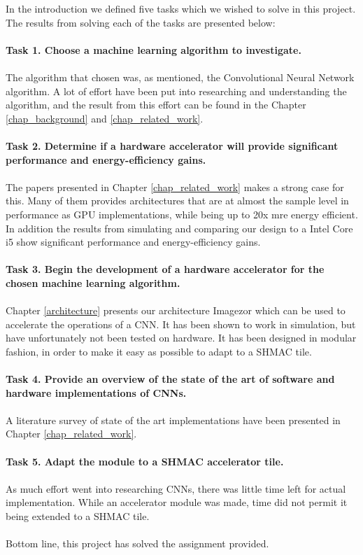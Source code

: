In the introduction we defined five tasks which we wished to solve in this project. The results from solving each of the tasks are presented below: \\ \hfil \\ \hfil
\textbf{Task 1. Choose a machine learning algorithm to investigate.} \\ \hfil \\ \hfil
The algorithm that chosen was, as mentioned, the Convolutional Neural Network algorithm. A lot of effort have been put into researching and understanding the algorithm, and the result from this effort can be found in the Chapter \ref{chap_background} and \ref{chap_related_work}. \\ \hfil \\ \hfil
\textbf{Task 2. Determine if a hardware accelerator will provide significant performance and energy-efficiency gains.}  \\ \hfil \\ \hfil
The papers presented in Chapter \ref{chap_related_work} makes a strong case for this. Many of them provides architectures that are at almost the sample level in performance as GPU implementations, while being up to 20x mre energy efficient. In addition the results from simulating and comparing our design to a Intel Core i5 show significant performance and energy-efficiency gains. \\ \hfil \\ \hfil
\textbf{Task 3. Begin the development of a hardware accelerator for the chosen machine learning algorithm.}\\ \hfil \\ \hfil
Chapter \ref{architecture} presents our architecture Imagezor which can be used to accelerate the operations of a CNN. It has been shown to work in simulation, but have unfortunately not been tested on hardware. It has been designed in modular fashion, in order to make it easy as possible to adapt to a SHMAC tile. \\ \hfil \\ \hfil
\textbf{Task 4. Provide an overview of the state of the art of software and hardware implementations of CNNs.} \\ \hfil \\ \hfil
A literature survey of state of the art implementations have been presented in Chapter \ref{chap_related_work}.\\ \hfil \\ \hfil
\textbf{Task 5. Adapt the module to a SHMAC accelerator tile.} \\ \hfil \\ \hfil
As much effort went into researching CNNs, there was little time left for actual implementation. While an accelerator module was made, time did not permit it being extended to a SHMAC tile. \\ \hfil \\ \hfil
Bottom line, this project has solved the assignment provided. 



 